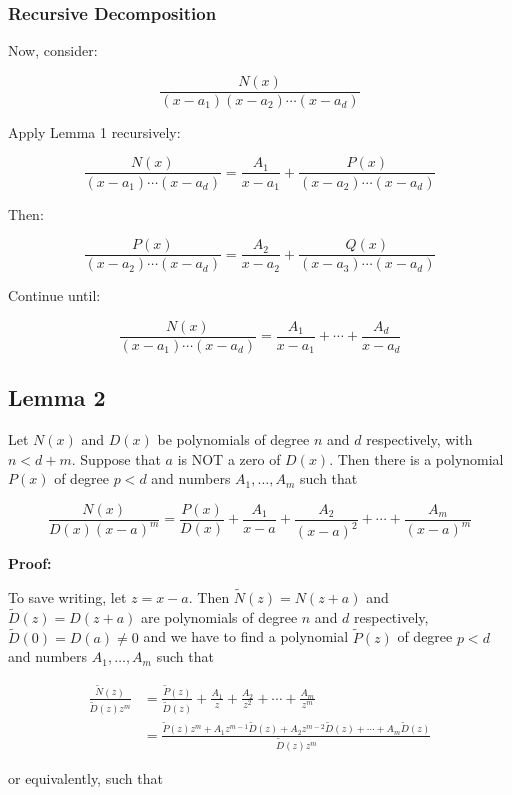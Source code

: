 \subsubsection{Recursive Decomposition}

Now, consider:

\[
    \frac{N(x)}{(x - a_1)(x - a_2)\cdots(x - a_d)}
\]

Apply Lemma 1 recursively:

\[
    \frac{N(x)}{(x - a_1)\cdots(x - a_d)} = \frac{A_1}{x - a_1} + \frac{P(x)}{(x - a_2)\cdots(x - a_d)}
\]

Then:

\[
    \frac{P(x)}{(x - a_2)\cdots(x - a_d)} = \frac{A_2}{x - a_2} + \frac{Q(x)}{(x - a_3)\cdots(x - a_d)}
\]

Continue until:

\[
    \frac{N(x)}{(x - a_1)\cdots(x - a_d)} = \frac{A_1}{x - a_1} + \cdots + \frac{A_d}{x - a_d}
\]

\subsection{Lemma 2}

Let \(N(x)\) and \(D(x)\) be polynomials of degree \(n\) and \(d\) respectively, with \(n < d + m\).
Suppose that \(a\) is NOT a zero of \(D(x)\). Then there is a polynomial \(P(x)\) of degree \(p < d\) and
numbers \(A_1, \dots, A_m\) such that

\[
    \frac{N(x)}{D(x) {(x-a)}^m} = \frac{P(x)}{D(x)} + \frac{A_1}{x-a} + \frac{A_2}{{(x-a)}^2} + \cdots + \frac{A_m}{{(x-a)}^m}
\]

\textbf{Proof:} 

To save writing, let \(z = x - a\). Then \(\tilde{N}(z) = N(z + a)\) and \(\tilde{D}(z) = D(z + a)\)
are polynomials of degree \(n\) and \(d\) respectively, \(\tilde{D}(0) = D(a) \neq 0\) and we have to find a
polynomial \(\tilde{P}(z)\) of degree \(p < d\) and numbers \(A_1, \dots, A_m\) such that

\begin{align*}
    \frac{\tilde{N}(z)}{\tilde{D}(z) z^m} &= \frac{\tilde{P}(z)}{\tilde{D}(z)} + \frac{A_1}{z} + \frac{A_2}{z^2} + \cdots + \frac{A_m}{z^m} \\
    &= \frac{\tilde{P}(z) z^m + A_1 z^{m-1} \tilde{D}(z) + A_2 z^{m-2} \tilde{D}(z) + \cdots + A_m \tilde{D}(z)}{\tilde{D}(z) z^m}
\end{align*}

or equivalently, such that

